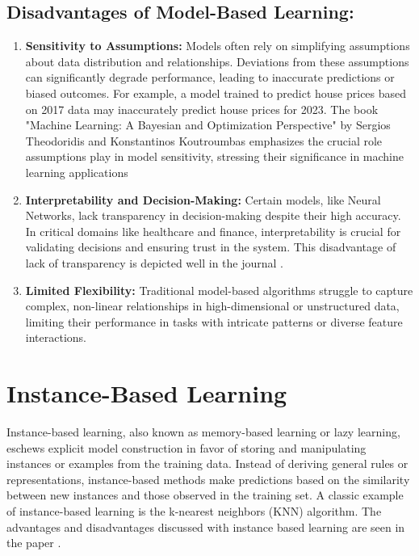 \documentclass[a4paper, 12pt]{report}
\begin{document}
\subsection{Disadvantages of Model-Based Learning:}
\begin{enumerate}
	\item \textbf{Sensitivity to Assumptions:} Models often rely on simplifying assumptions about data distribution and relationships. 
          Deviations from these assumptions can significantly degrade performance, leading to inaccurate predictions or biased outcomes. 
          For example, a model trained to predict house prices based on 2017 data may inaccurately predict house prices for 2023. 
          The book "Machine Learning: A Bayesian and Optimization Perspective" by Sergios Theodoridis and Konstantinos Koutroumbas 
          emphasizes the crucial role assumptions play in model sensitivity, stressing their significance in machine 
          learning applications \cite{theodoridis2015machine}
	\item \textbf{Interpretability and Decision-Making:} Certain models, like Neural Networks, lack transparency in decision-making despite their high accuracy.
	      In critical domains like healthcare and finance, interpretability is crucial for validating decisions and ensuring trust in the system. This disadvantage of lack of transparency
          is depicted well in the journal \cite{rudin2019stop}.
	\item \textbf{Limited Flexibility:} Traditional model-based algorithms struggle to capture complex, non-linear relationships in high-dimensional or unstructured data,
	      limiting their performance in tasks with intricate patterns or diverse feature interactions. 
\end{enumerate}

\section{Instance-Based Learning}

Instance-based learning, also known as memory-based learning or lazy learning, eschews explicit model construction in favor of storing and manipulating instances or examples from the training data.
Instead of deriving general rules or representations, instance-based methods make predictions based on the similarity between new instances and those observed in the training set. 
A classic example of instance-based learning is the k-nearest neighbors (KNN) algorithm. 
The advantages and disadvantages discussed with instance based learning are seen in the paper \cite{aha1991instance}.
\end{document}
